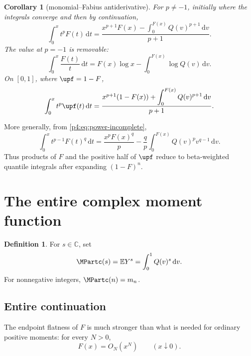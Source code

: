 \documentclass[11pt,oneside]{article}
\newtheorem{corollary}[theorem]{Corollary}
\theoremstyle{definition}
\newtheorem{definition}[theorem]{Definition}
\theoremstyle{remark}
\newcommand{\F}{F}
\newcommand{\Q}{Q}
\newcommand{\E}{\mathbb E}
\newcommand{\C}{\mathbb C}
\newcommand{\dd}{\,\mathrm d}
\newcommand{\1}{\mathbf 1}
\begin{document}
\begin{corollary}[monomial--Fabius antiderivative]\label{p4:cor:monomial-F}
For \(p\ne-1\), initially where the integrals converge and then by continuation,
\begin{equation}\label{p4:eq:monomial-F-antiderivative}
 \int_0^x t^p\F(t)\dd t
 =\frac{x^{p+1}\F(x)-\displaystyle\int_0^{\F(x)}\Q(v)^{p+1}\dd v}{p+1}.
\end{equation}
The value at \(p=-1\) is removable:
\begin{equation}\label{p4:eq:F-over-x-incomplete}
 \int_0^x\frac{\F(t)}t\dd t
 =\F(x)\log x-\int_0^{\F(x)}\log\Q(v)\dd v.
\end{equation}
On \([0,1]\), where \(\upf=1-\F\),
\begin{equation}\label{p4:eq:monomial-up-half-antiderivative}
 \int_0^x t^p\upf(t)\dd t
 =\frac{x^{p+1}(1-\F(x))+\displaystyle\int_0^{\F(x)}\Q(v)^{p+1}\dd v}{p+1}.
\end{equation}
\end{corollary}

More generally, from \cref{p4:eq:power-incomplete},
\begin{equation}\label{p4:eq:Fpower-antiderivative}
 \int_0^x t^{p-1}\F(t)^q\dd t
 =\frac{x^p\F(x)^q}{p}
 -\frac{q}{p}\int_0^{\F(x)}\Q(v)^p v^{q-1}\dd v.
\end{equation}
Thus products of \(\F\) and the positive half of \(\upf\) reduce to beta-weighted
quantile integrals after expanding \((1-\F)^n\).

\section{The entire complex moment function}

\begin{definition}\label{p4:def:M}
For \(s\in\C\), set
\begin{equation}\label{p4:eq:Mdef}
 \MPartc(s)=\E Y^s=\int_0^1\Q(v)^s\dd v.
\end{equation}
For nonnegative integers, \(\MPartc(n)=m_n\).
\end{definition}

\subsection{Entire continuation}

The endpoint flatness of \(\F\) is much stronger than what is needed for ordinary
positive moments: for every \(N>0\),
\begin{equation}\label{p4:eq:F-flat-bound}
 \F(x)=O_N(x^N)\qquad(x\downarrow0).
\end{equation}
\end{document}
